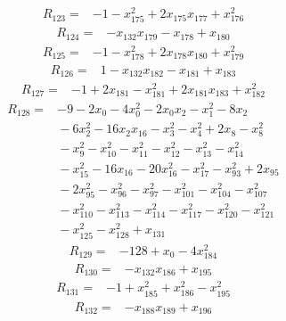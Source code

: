 {\begin{align*}
R_{123} ={}& -1 - x_{175}^{2} + 2x_{175} x_{177} + x_{176}^{2}
\end{align*}
\begin{align*}
R_{124} ={}& -x_{132} x_{179} - x_{178} + x_{180}
\end{align*}
\begin{align*}
R_{125} ={}& -1 - x_{178}^{2} + 2x_{178} x_{180} + x_{179}^{2}
\end{align*}
\begin{align*}
R_{126} ={}& 1 - x_{132} x_{182} - x_{181} + x_{183}
\end{align*}
\begin{align*}
R_{127} ={}& -1 + 2x_{181} - x_{181}^{2} + 2x_{181} x_{183} + x_{182}^{2}
\end{align*}
\begin{align*}
R_{128} ={}& -9 - 2x_{0} - 4x_{0}^{2} - 2x_{0} x_{2} - x_{1}^{2} - 8x_{2} \\
&{}  - 6x_{2}^{2} - 16x_{2} x_{16} - x_{3}^{2} - x_{4}^{2} + 2x_{8} - x_{8}^{2} \\
&{}  - x_{9}^{2} - x_{10}^{2} - x_{11}^{2} - x_{12}^{2} - x_{13}^{2} - x_{14}^{2} \\
&{}  - x_{15}^{2} - 16x_{16} - 20x_{16}^{2} - x_{17}^{2} - x_{93}^{2} + 2x_{95} \\
&{}  - 2x_{95}^{2} - x_{96}^{2} - x_{97}^{2} - x_{101}^{2} - x_{104}^{2} - x_{107}^{2} \\
&{}  - x_{110}^{2} - x_{113}^{2} - x_{114}^{2} - x_{117}^{2} - x_{120}^{2} - x_{121}^{2} \\
&{}  - x_{125}^{2} - x_{128}^{2} + x_{131}
\end{align*}
\begin{align*}
R_{129} ={}& -128 + x_{0} - 4x_{184}^{2}
\end{align*}
\begin{align*}
R_{130} ={}& -x_{132} x_{186} + x_{195}
\end{align*}
\begin{align*}
R_{131} ={}& -1 + x_{185}^{2} + x_{186}^{2} - x_{195}^{2}
\end{align*}
\begin{align*}
R_{132} ={}& -x_{188} x_{189} + x_{196}

\end{align*}}
